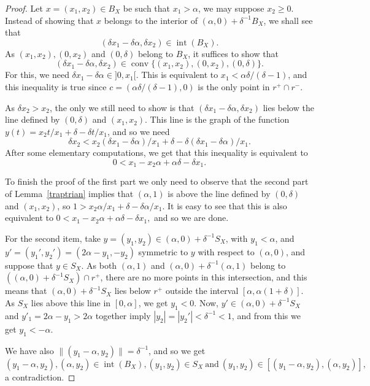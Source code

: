 \documentclass[12pt]{amsproc}
\theoremstyle{remark}
\def\equi{=}
\def\interior{\operatorname{int}}
\def\conv{\operatorname{conv}}
\begin{document}
\begin{proof}
Let $x\equi(x_1,x_2)\in B_X$ be such that $x_1>\alpha$, we may suppose $x_2\geq 0$. 
Instead of showing that $x$ belongs to the interior of $(\alpha,0)+\delta^{-1}B_X$, we shall see that 
$$(\delta x_1-\delta\alpha,\delta x_2)\in \interior(B_X).$$ 
As $(x_1,x_2), (0,x_2)$ and $(0,\delta)$ belong to $B_X$, it suffices to show that 
$$(\delta x_1-\delta\alpha,\delta x_2)\in\conv\{(x_1,x_2),(0,x_2),(0,\delta)\}.$$
For this, we need $\delta x_1-\delta\alpha\in ]0,x_1[$. This is equivalent 
to $x_1<\alpha\delta/(\delta-1)$, and this inequality is true %
since $c\equi(\alpha\delta/(\delta-1),0)$ is the only point in $r^+\cap r^-$. 

As $\delta x_2>x_2$, the only we still need to show is that $(\delta x_1-\delta\alpha,\delta x_2)$ 
lies below the line defined by $(0,\delta)$ and $(x_1,x_2)$. This line is the 
graph of the function $y(t)=x_2t/x_1+\delta-\delta t/x_1$, and so we need 
$$\delta x_2<x_2(\delta x_1-\delta\alpha)/x_1+\delta-\delta (\delta x_1-\delta\alpha)/x_1.$$
After some elementary computations, we get that this inequality is equivalent to 
$$0<x_1-x_2\alpha+\alpha\delta-\delta x_1.$$

To finish the proof of the first part we only need to observe that the second 
part of Lemma~\ref{traptrian} implies that $(\alpha,1)$ is above the line 
defined by $(0,\delta)$ and $(x_1,x_2)$, so $1>x_2\alpha/x_1+\delta-\delta \alpha/x_1$. It is easy 
to see that this is also equivalent to $0<x_1-x_2\alpha+\alpha\delta-\delta x_1,$ and so we are done. 

For the second item, take $y\equi(y_1,y_2)\in(\alpha,0)+\delta^{-1}S_X$, with 
$y_1<\alpha$, and $y'\equi(y_1',y_2')\equi(2\alpha-y_1,-y_2)$ symmetric 
to $y$ with respect to $(\alpha,0)$, and suppose that $y\in S_X$. 
As both $(\alpha,1)$ and $(\alpha,0)+\delta^{-1}(\alpha,1)$ belong to 
$((\alpha,0)+\delta^{-1}S_X)\cap r^+$, there are no more points in this intersection, 
and this means that $(\alpha,0)+\delta^{-1}S_X$ lies below $r^+$ outside the 
interval $[\alpha,\alpha(1+\delta)]$. As $S_X$ lies above this line in $[0,\alpha]$, 
we get $y_1<0$. Now, $y'\in (\alpha,0)+\delta^{-1}S_X$ and $y'_1=2\alpha-y_1>2\alpha$ 
together imply $|y_2|=|y_2'|<\delta^{-1}<1$, and from this we get $y_1<-\alpha$. 

We have also $\|(y_1-\alpha,y_2)\|=\delta^{-1}$, and so we get 
$$(y_1-\alpha,y_2), (\alpha, y_2)\in \interior(B_X), (y_1,y_2)\in S_X\mathrm{\  and\ }
(y_1,y_2)\in[(y_1-\alpha,y_2), (\alpha, y_2)],$$ a contradiction. 
 
\end{proof}
\end{document}
